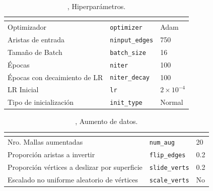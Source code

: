 \begin{table}[h]
\centering
\begin{tabular}{|ll|l|}
\hline
\rowcolor[HTML]{FFC702}
\multicolumn{2}{|c|}{\cellcolor[HTML]{FFC702}{Hiperparámetro}} & \multicolumn{1}{c|}{\cellcolor[HTML]{FFC702}{Valor}} \\ \hline
Optimizador & \lstinline!optimizer! & Adam \\ \hline
Aristas de entrada & \lstinline!ninput_edges! & 750 \\ \hline
Tamaño de Batch & \lstinline!batch_size! & 16 \\ \hline
Épocas & \lstinline!niter! & 100 \\ \hline
Épocas con decaimiento de LR & \lstinline!niter_decay! & 100 \\ \hline
LR Inicial & \lstinline!lr! & $2\times10^{-4}$ \\ \hline
Tipo de inicialización & \lstinline!init_type! & Normal \\ \hline
\end{tabular}
\caption[SHREC16: Hiperparámetros]{, Hiperparámetros.}
\label{table:SHREC16_hyperParams}
\end{table}

\begin{table}[h]
\centering
\begin{tabular}{|ll|l|}
\hline
\rowcolor[HTML]{FFC702}
\multicolumn{2}{|c|}{\cellcolor[HTML]{FFC702}{Modificación}} & \multicolumn{1}{c|}{\cellcolor[HTML]{FFC702}{Valor}} \\ \hline
Nro. Mallas aumentadas & \lstinline!num_aug! & 20 \\ \hline
Proporción aristas a invertir & \lstinline!flip_edges! & 0.2 \\ \hline
Proporción vértices a deslizar por superficie & \lstinline!slide_verts! & 0.2 \\ \hline
Escalado no uniforme aleatorio de vértices & \lstinline!scale_verts! & No \\ \hline
\end{tabular}
\caption[SHREC16: Aumento de datos]{, Aumento de datos.}
\label{table:SHREC16_dataAug}
\end{table}

